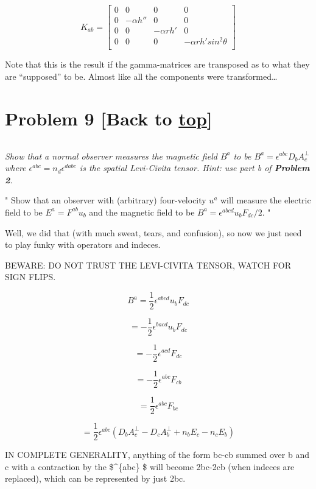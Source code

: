 \documentclass[landscape,letterpaper,10pt,english]{article}
\begin{document}
\[ K_{ab} = \begin{bmatrix}
0 & 0 & 0 & 0 \\
0 & -\alpha h'' & 0 & 0 \\
0 & 0 & -\alpha rh' & 0 \\
0 & 0 & 0 & -\alpha rh' sin^2\theta \\
\end{bmatrix}\]

Note that this is the result if the gamma-matrices are transposed as to
what they are ``supposed'' to be. Almost like all the components were
transformed\ldots{}

    \hypertarget{problem-9-back-to-top}{%
\section{\texorpdfstring{Problem 9 {[}Back to
\hyperref[toc]{top}{]}}{Problem 9 {[}Back to {]}}}\label{problem-9-back-to-top}}

\[\label{P9}\]

\emph{Show that a normal observer measures the magnetic field \(B^a\) to
be \(B^a = \epsilon^{abc} D_b A^\perp_c\) where
\(\epsilon^{abc} = n_d\epsilon^{dabc}\) is the spatial Levi-Civita
tensor. Hint: use part b of \textbf{Problem 2}.}

    " Show that an observer with (arbitrary) four-velocity \(u^a\) will
measure the electric field to be \(E^a = F^{ab}u_b\) and the magnetic
field to be \(B^a = \epsilon^{abcd}u_b F_{dc}/2\). "

    Well, we did that (with much sweat, tears, and confusion), so now we
just need to play funky with operators and indeces.

BEWARE: DO NOT TRUST THE LEVI-CIVITA TENSOR, WATCH FOR SIGN FLIPS.

\[ B^a = \frac12 \epsilon^{abcd} u_b F_{dc}  \]

\[ = -\frac12 \epsilon^{bacd} u_b F_{dc} \]

\[ = -\frac12 \epsilon^{acd} F_{dc} \]

\[ = -\frac12 \epsilon^{abc} F_{cb} \]

\[ = \frac12 \epsilon^{abc} F_{bc} \]

\[ = \frac12 \epsilon^{abc} ( D_bA_c^\perp - D_cA_b^\perp + n_bE_c - n_cE_b ) \]

IN COMPLETE GENERALITY, anything of the form bc-cb summed over b and c
with a contraction by the \$\epsilon\^{}\{abc\} \$ will become 2bc-2cb
(when indeces are replaced), which can be represented by just 2bc.
\end{document}
